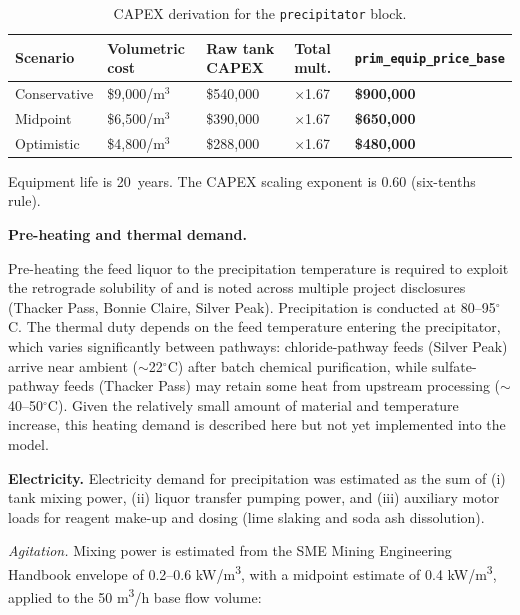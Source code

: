 \begin{table}[h!]
\caption{CAPEX derivation for the \texttt{precipitator} block.}
\centering
\begin{tabular}{>{\raggedright\arraybackslash}p{2.5cm}
                >{\raggedright\arraybackslash}p{2.8cm}
                >{\raggedright\arraybackslash}p{2.8cm}
                >{\raggedright\arraybackslash}p{2cm}
                >{\raggedright\arraybackslash}p{4.5cm}}
\toprule
\textbf{Scenario} & \textbf{Volumetric cost} & \textbf{Raw tank CAPEX} & \textbf{Total mult.} & \texttt{prim\_equip\_price\_base} \\
\midrule
Conservative & \$9,000/m$^3$ & \$540,000 & $\times$1.67 & \textbf{\$900,000} \\
Midpoint     & \$6,500/m$^3$ & \$390,000 & $\times$1.67 & \textbf{\$650,000} \\
Optimistic   & \$4,800/m$^3$ & \$288,000 & $\times$1.67 & \textbf{\$480,000} \\
\bottomrule
\end{tabular}
\end{table}

\noindent Equipment life is 20~years. The CAPEX scaling exponent is 0.60 (six-tenths rule).

\medskip
\noindent\textbf{Pre-heating and thermal demand.}\quad

Pre-heating the feed liquor to the precipitation temperature is required to exploit the retrograde solubility of  and is noted across multiple project disclosures (Thacker Pass, Bonnie Claire, Silver Peak). Precipitation is conducted at 80--95$^\circ$C. The thermal duty depends on the feed temperature entering the precipitator, which varies significantly between pathways: chloride-pathway feeds (Silver Peak) arrive near ambient ($\sim$22$^\circ$C) after batch chemical purification, while sulfate-pathway feeds (Thacker Pass) may retain some heat from upstream processing ($\sim$40--50$^\circ$C). Given the relatively small amount of material and temperature increase, this heating demand is described here but not yet implemented into the model. 

\medskip
\noindent\textbf{Electricity.}\quad
Electricity demand for precipitation was estimated as the sum of (i) tank mixing power, (ii) liquor transfer pumping power, and (iii) auxiliary motor loads for reagent make-up and dosing (lime slaking and soda ash dissolution).

\textit{Agitation.} Mixing power is estimated from the SME Mining Engineering Handbook envelope of 0.2--0.6 \si{kW/m^3}, with a midpoint estimate of 0.4 \si{kW/m^3}, applied to the 50 \si{m^3/h} base flow volume:
 
